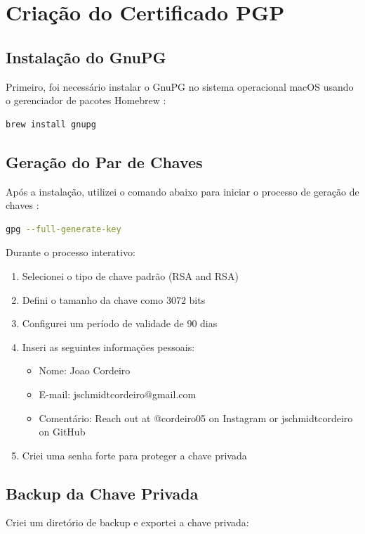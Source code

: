 \chapter{Criação do Certificado PGP}

\section{Instalação do GnuPG}
Primeiro, foi necessário instalar o GnuPG no sistema operacional macOS usando o gerenciador de pacotes Homebrew \cite{gnupgdoc}:

\begin{lstlisting}[language=bash]
brew install gnupg
\end{lstlisting}

\section{Geração do Par de Chaves}
Após a instalação, utilizei o comando abaixo para iniciar o processo de geração de chaves \cite{gnupgdoc}:

\begin{lstlisting}[language=bash]
gpg --full-generate-key
\end{lstlisting}

Durante o processo interativo:
\begin{enumerate}
    \item Selecionei o tipo de chave padrão (RSA and RSA)
    \item Defini o tamanho da chave como 3072 bits
    \item Configurei um período de validade de 90 dias
    \item Inseri as seguintes informações pessoais:
    \begin{itemize}
        \item Nome: Joao Cordeiro
        \item E-mail: jschmidtcordeiro@gmail.com
        \item Comentário: Reach out at @cordeiro05 on Instagram or jschmidtcordeiro on GitHub
    \end{itemize}
    \item Criei uma senha forte para proteger a chave privada
\end{enumerate}

\section{Backup da Chave Privada}
Criei um diretório de backup e exportei a chave privada:

